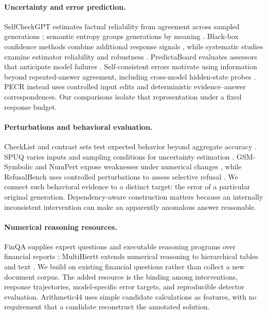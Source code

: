 \paragraph{Uncertainty and error prediction.}
SelfCheckGPT estimates factual reliability from agreement across sampled generations \citep{manakul-etal-2023-selfcheckgpt}; semantic entropy groups generations by meaning \citep{farquhar-etal-2024-semantic}. Black-box confidence methods combine additional response signals \citep{chen-mueller-2024-quantifying}, while systematic studies examine estimator reliability and robustness \citep{mahaut-etal-2024-factual,vashurin-etal-2025-benchmarking}. PredictaBoard evaluates assessors that anticipate model failures \citep{pacchiardi-etal-2025-predictaboard}. Self-consistent errors motivate using information beyond repeated-answer agreement, including cross-model hidden-state probes \citep{tan-etal-2025-consistent}. PECR instead uses controlled input edits and deterministic evidence--answer correspondences. Our comparisons isolate that representation under a fixed response budget.

\paragraph{Perturbations and behavioral evaluation.}
CheckList and contrast sets test expected behavior beyond aggregate accuracy \citep{ribeiro-etal-2020-beyond,gardner-etal-2020-evaluating}. SPUQ varies inputs and sampling conditions for uncertainty estimation \citep{gao-etal-2024-spuq}. GSM-Symbolic and NumPert expose weaknesses under numerical changes \citep{mirzadeh-etal-2025-gsm,aarnes-setty-2025-numpert}, while RefusalBench uses controlled perturbations to assess selective refusal \citep{muhamed-etal-2026-refusalbench}. We connect such behavioral evidence to a distinct target: the error of a particular original generation. Dependency-aware construction matters because an internally inconsistent intervention can make an apparently anomalous answer reasonable.

\paragraph{Numerical reasoning resources.}
FinQA supplies expert questions and executable reasoning programs over financial reports \citep{chen-etal-2021-finqa}; MultiHiertt extends numerical reasoning to hierarchical tables and text \citep{zhao-etal-2022-multihiertt}. We build on existing financial questions rather than collect a new document corpus. The added resource is the binding among interventions, response trajectories, model-specific error targets, and reproducible detector evaluation. Arithmetic44 uses simple candidate calculations as features, with no requirement that a candidate reconstruct the annotated solution.

